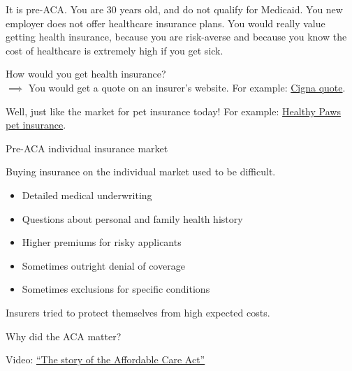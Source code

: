 \begin{frame}{}

    It is pre-ACA. You are 30 years old, and do not qualify for Medicaid.
    You new employer does not offer healthcare insurance plans.
    You would really value getting health insurance, because you are risk-averse and because you know the cost of healthcare is extremely high if you get sick.\\
    \vspace{5mm}

    How would you get health insurance?\\
    \vspace{5mm}
    \pause
    $\implies$ You would get a quote on an insurer's website. For example: \href{https://www.cignaglobal.com/quote}{Cigna quote}.\\
    \pause

    Well, just like the market for pet insurance today! For example: \href{https://www.healthypawspetinsurance.com}{Healthy Paws pet insurance}.\\
    
\end{frame}
\begin{frame}{Pre-ACA individual insurance market}

    Buying insurance on the individual market used to be difficult.
    \begin{itemize}
        \item Detailed medical underwriting
        \item Questions about personal and family health history
        \item Higher premiums for risky applicants
        \item Sometimes outright denial of coverage
        \item Sometimes exclusions for specific conditions
    \end{itemize}

    \vspace{3mm}

    Insurers tried to protect themselves from high expected costs.

\end{frame}
\begin{frame}{Why did the ACA matter?}

    Video: \href{https://www.youtube.com/watch?v=P9LTAageny0}{``The story of the Affordable Care Act''}

\end{frame}
